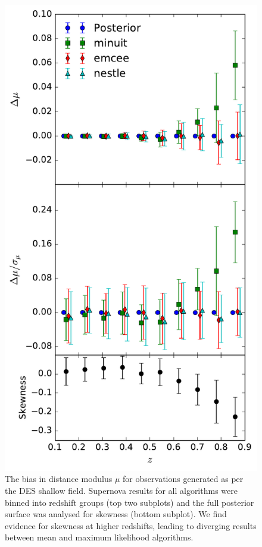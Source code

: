 \documentclass[a4paper,fleqn,usenatbib]{mnras}
\begin{document}
\begin{figure}
	\includegraphics[width=\columnwidth]{../output/bias_dessky.pdf}
    \caption{The bias in distance modulus $\mu$ for observations generated as per the DES shallow field. Supernova results for all algorithms were binned into redshift groups (top two subplots) and the full posterior surface was analysed for skewness (bottom subplot). We find evidence for skewness at higher redshifts, leading to diverging results between mean and maximum likelihood algorithms.}
    \label{fig:bias_des}
\end{figure}
\end{document}
